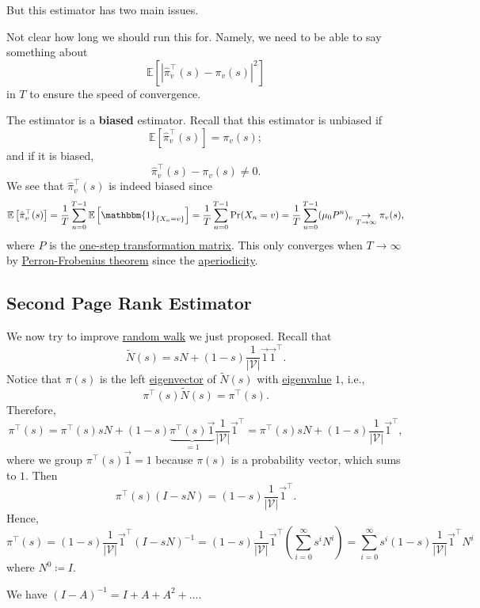But this estimator has two main issues.
\begin{problem}
Not clear how long we should run this for. Namely, we need to be able to say something about
\[
	\mathbb{E}\left[\left\vert \hat{\pi}^{\top}_v(s) - \pi_v(s) \right\vert^2 \right]
\]
in \(T\) to ensure the speed of convergence.
\end{problem}

\begin{problem}[Biased]
The estimator is a \textbf{biased} estimator. Recall that this estimator is unbiased if
\[
	\mathbb{E}\left[ \hat{\pi}_{v}^{\top}(s) \right] = \pi_v(s);
\]
and if it is biased,
\[
	\hat{\pi}_{v}^{\top}(s) - \pi_v(s)\neq 0.
\]
We see that \(\hat{\pi}^{\top}_v(s)\) is indeed biased since
\[
	\mathbb{E}\left[\hat{\pi}^{\top}_v(s)\right] = \frac{1}{T}\sum\limits_{n=0}^{T-1} \mathbb{E}\left[\mathbbm{1}_{\{X_n = v\}} \right]
	= \frac{1}{T}\sum\limits_{n=0}^{T-1} \Pr(X_n = v)
	= \frac{1}{T}\sum\limits_{n=0}^{T-1} (\mu_0 P^n)_v\underset{T\to \infty }{\to }\pi_v(s),
\]
where \(P\) is the \underline{one-step transformation matrix}. This only converges when \(T\to \infty \) by \hyperref[thm:Perron-Frobenius-theorem]{Perron-Frobenius theorem} since the \hyperref[def:aperiodic]{aperiodicity}.
\end{problem}

\subsection{Second Page Rank Estimator}\label{subsec:second-page-rank-estimator}
We now try to improve \hyperref[algo:random-walk-algorithm]{random walk} we just proposed. Recall that
\[
	\widetilde{N}(s) = sN+(1-s)\frac{1}{\left\vert \mathcal{V}  \right\vert }\vec{1}\vec{1}^{\top}.
\]
Notice that \(\pi(s)\) is the left \hyperref[def:eigenvector]{eigenvector} of \(\widetilde{N}(s)\) with \hyperref[def:eigenvalue]{eigenvalue} \(1\), i.e.,
\[
	\pi^{\top}(s)\widetilde{N}(s) = \pi^{\top}(s).
\]
Therefore,
\[
	\pi ^{\top} (s)
	= \pi^{\top}(s)sN+(1 - s)\underbrace{\pi^{\top}(s)\vec{1}}_{ = 1}\frac{1}{\left\vert \mathcal{V}\right\vert}\vec{1}^{\top}
	= \pi^{\top}(s)sN+(1 - s)\frac{1}{\left\vert \mathcal{V}  \right\vert}\vec{1}^{\top},
\]
where we group \(\pi^{\top}(s)\vec{1} = 1\) because \(\pi(s)\) is a probability vector, which sums to \(1\). Then
\[
	\pi^{\top}(s)(I - sN) = (1 - s)\frac{1}{\left\vert \mathcal{V}  \right\vert}\vec{1}^{\top}.
\]
Hence,
\[
	\pi^{\top}(s) = (1 - s)\frac{1}{\left\vert \mathcal{V}  \right\vert}\vec{1}^{\top}(I - sN)^{-1}
	= (1 - s)\frac{1}{\left\vert \mathcal{V}  \right\vert}\vec{1}^{\top}\left(\sum\limits_{i=0}^{\infty} s^i N^i\right)
	= \sum\limits_{i=0}^{\infty} s^i (1 - s)\frac{1}{\left\vert \mathcal{V}  \right\vert}\vec{1}^{\top}N^i
\]
where \(N^0\coloneqq I\).
\begin{prev}
	We have \((I - A)^{-1} = I + A + A^2 + \dots\).
\end{prev}

